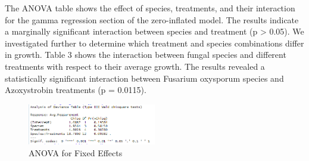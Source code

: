\documentclass[
  10pt,
  letterpaper,
  twocolumn]{article}
\begin{document}
The ANOVA table shows the effect of species, treatments, and their
interaction for the gamma regression section of the zero-inflated model.
The results indicate a marginally significant interaction between
species and treatment (p \textgreater{} 0.05). We investigated further
to determine which treatment and species combinations differ in growth.
Table 3 shows the interaction between fungal species and different
treatments with respect to their average growth. The results revealed a
statistically significant interaction between Fusarium oxysporum species
and Azoxystrobin treatments (p = 0.0115).

\begin{figure}

{\centering \includegraphics[width=0.5\textwidth,height=\textheight]{Fig11.png}

}

\caption{ANOVA for Fixed Effects}

\end{figure}
\end{document}
